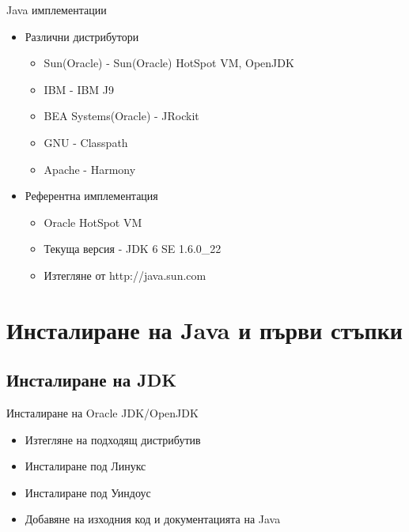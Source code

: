 \documentclass{beamer}
\begin{document}
\begin{frame}{Java имплементации}
  \transdissolve
  \begin{itemize}
  \item Различни дистрибутори
    \begin{itemize}
      \item Sun(Oracle) - Sun(Oracle) HotSpot VM, OpenJDK \pause
      \item IBM - IBM J9 \pause
      \item BEA Systems(Oracle) - JRockit \pause
      \item GNU - Classpath \pause
      \item Apache - Harmony 
    \end{itemize}
    \pause
  \item Референтна имплементация
    \begin{itemize}
      \item Oracle HotSpot VM
      \item Текуща версия - JDK 6 SE 1.6.0\_22
      \item Изтегляне от http://java.sun.com
    \end{itemize}
  \end{itemize}
\end{frame}

\section{Инсталиране на Java и първи стъпки}
\subsection{Инсталиране на JDK}
\begin{frame}{Инсталиране на Oracle JDK/OpenJDK}
  \transdissolve  
  \begin{itemize}
    \item Изтегляне на подходящ дистрибутив \pause
    \item Инсталиране под Линукс \pause
    \item Инсталиране под Уиндоус \pause
    \item Добавяне на изходния код и
      документацията на Java \pause
  \end{itemize}
\end{frame}
\end{document}
